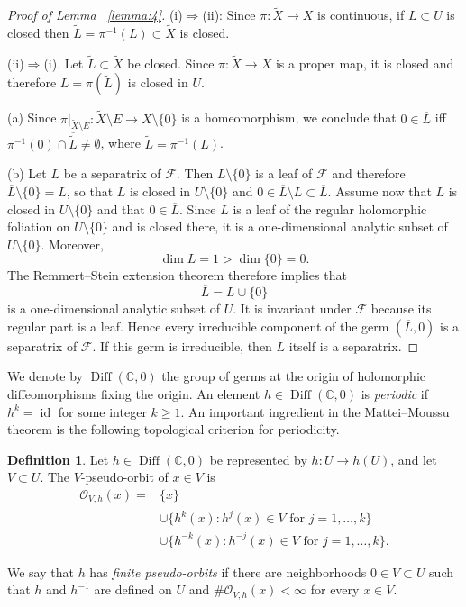 \documentclass[11pt,twoside]{amsart}
\newcommand{\F}{\mathcal F}
\theoremstyle{definition}
\newtheorem{defi}{Definition}
\begin{document}
\begin{proof}[Proof of Lemma ~\ref{lemma:4}]
(i)$\Rightarrow$(ii): Since $\pi\colon\widetilde X\to X$ is continuous, if $L\subset U$ is closed then
$\widetilde L=\pi^{-1}(L)\subset \widetilde X$ is closed.

(ii)$\Rightarrow$(i). Let $\widetilde L\subset\widetilde X$ be closed. Since $\pi\colon\widetilde X\to X$ is a proper map, it is closed and therefore $L=\pi(\widetilde L)$ is closed in $U$.

(a) Since $\pi\big|_{\widetilde X\setminus E}\colon\widetilde X\setminus E\to X\setminus\{0\}$ is a homeomorphism, we conclude that
$0\in\overline{L}$ iff $\pi^{-1}(0)\cap\overline{\widetilde L}\neq\emptyset$, where $\widetilde L=\pi^{-1}(L)$.

(b) Let $\overline{L}$ be a separatrix of $\F$. Then $\overline{L}\setminus\{0\}$ is a leaf of $\F$ and therefore
$\overline{L}\setminus\{0\}=L$,
so that $L$ is closed in $U\setminus\{0\}$ and $0\in\overline{L}\setminus L\subset \overline{L}$.
Assume now that $L$ is closed in $U\setminus\{0\}$ and that
$0\in\overline L$. Since $L$ is a leaf of the regular holomorphic
foliation on $U\setminus\{0\}$ and is closed there, it is a
one-dimensional analytic subset of $U\setminus\{0\}$. Moreover,
\[
\dim L=1>\dim\{0\}=0.
\]
The Remmert--Stein extension theorem therefore implies that
\[
\overline L=L\cup\{0\}
\]
is a one-dimensional analytic subset of $U$. It is invariant under
$\F$ because its regular part is a leaf. Hence every irreducible
component of the germ $(\overline L,0)$ is a separatrix of $\F$.
If this germ is irreducible, then $\overline L$ itself is a
separatrix.
\end{proof}
We denote by $\operatorname{Diff}(\mathbb C,0)$ the group of germs at the
origin of holomorphic diffeomorphisms fixing the origin. An element
$h\in\operatorname{Diff}(\mathbb C,0)$ is \emph{periodic} if
$h^k=\operatorname{id}$ for some integer $k\geq1$. An important ingredient
in the Mattei--Moussu theorem is the following topological criterion for
periodicity.


\begin{defi}
    \label{Definition:finiteorbits}
Let $h\in\operatorname{Diff}(\mathbb C,0)$ be represented by
$h:U\to h(U)$, and let $V\subset U$. The $V$-pseudo-orbit of $x\in V$ is
\begin{align*}
\mathcal O_{V,h}(x)
={}&\{x\}\\
&\cup\{h^k(x):h^j(x)\in V\text{ for }j=1,\ldots,k\}\\
&\cup\{h^{-k}(x):h^{-j}(x)\in V\text{ for }j=1,\ldots,k\}.
\end{align*}

We say that $h$ has {\it finite pseudo-orbits} if there are neighborhoods
$0\in V\subset U$ such that $h$ and $h^{-1}$ are defined on $U$ and
$\#\mathcal O_{V,h}(x)<\infty$ for every $x\in V$.
\end{defi}
\end{document}
